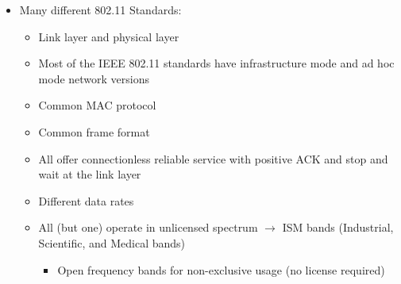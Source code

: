 \begin{itemize}
    \begin{itemize}

      \item Many different 802.11 Standards:

        \begin{itemize}

          \item Link layer and physical layer

          \item Most of the IEEE 802.11 standards have infrastructure mode and ad hoc mode network versions

          \item Common MAC protocol

          \item Common frame format

          \item All offer connectionless reliable service with positive ACK and stop and wait at the link layer

          \item Different data rates

          \item All (but one) operate in unlicensed spectrum $\to$ ISM bands (Industrial, Scientific, and Medical bands)

            \begin{itemize}

              \item Open frequency bands for non-exclusive usage (no license required)

            \end{itemize}

        \end{itemize}

    \end{itemize}

\end{itemize}



